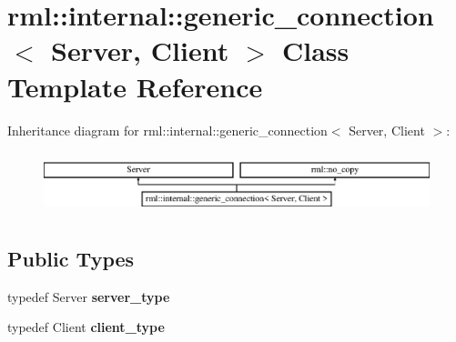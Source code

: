 \hypertarget{classrml_1_1internal_1_1generic__connection}{}\section{rml\+:\+:internal\+:\+:generic\+\_\+connection$<$ Server, Client $>$ Class Template Reference}
\label{classrml_1_1internal_1_1generic__connection}
Inheritance diagram for rml\+:\+:internal\+:\+:generic\+\_\+connection$<$ Server, Client $>$\+:\begin{figure}[H]
\begin{center}
\leavevmode
\includegraphics[height=1.824104cm]{classrml_1_1internal_1_1generic__connection}
\end{center}
\end{figure}
\subsection*{Public Types}
\begin{DoxyCompactItemize}
\item 
\hypertarget{classrml_1_1internal_1_1generic__connection_ad5f3a436f3bc9aa0f00343fcb39ca9a9}{}typedef Server {\bfseries server\+\_\+type}\label{classrml_1_1internal_1_1generic__connection_ad5f3a436f3bc9aa0f00343fcb39ca9a9}

\item 
\hypertarget{classrml_1_1internal_1_1generic__connection_a48e009f8d13f089d7b1d1723e6b917ec}{}typedef Client {\bfseries client\+\_\+type}\label{classrml_1_1internal_1_1generic__connection_a48e009f8d13f089d7b1d1723e6b917ec}

\end{DoxyCompactItemize}
